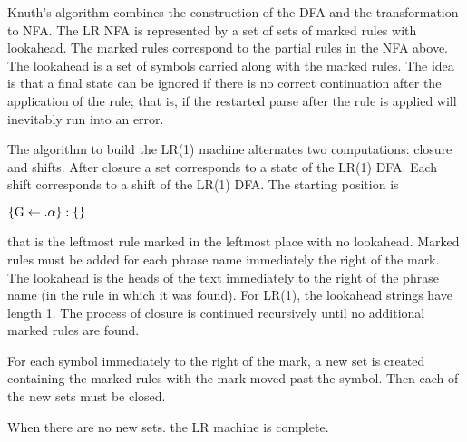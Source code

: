 Knuth's algorithm combines the construction of the DFA and 
the transformation to NFA.  
The LR NFA is represented by a set of sets of marked rules with lookahead.
The marked rules correspond to the partial rules in the NFA above.
The lookahead is a set of symbols carried along with the marked rules.
The idea is that a final state can be ignored if there is no correct
continuation after the application of the rule; 
that is, if the restarted parse after the rule is applied
will inevitably run into an error.

The algorithm to build the LR(1) machine alternates two computations:
closure and shifts.  
After closure a set corresponds to a state of the LR(1) DFA.
Each shift corresponds to a shift of the LR(1) DFA.
The starting position is 

\begin{center}
$\{{\rm G}\leftarrow.\alpha\}:\{\}$
\end{center}

\noindent that is the leftmost rule marked in the leftmost place with no lookahead.
Marked rules must be added for each phrase name immediately 
the right of the mark. 
The lookahead is the heads of the text immediately
to the right of the phrase name (in the rule in which it was found).
For LR(1), the lookahead strings have length 1.
The process of closure is continued recursively until no additional 
marked rules are found.

For each symbol immediately to the right of the mark,
a new set is created containing the marked rules with the 
mark moved past the symbol.  
Then each of the new sets must be closed.

When there are no new sets. the LR machine is complete.


